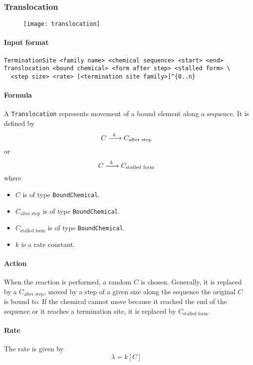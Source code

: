\subsubsection{Translocation}

\begin{figure}[!ht]
	\centering
	\texttt{[image: translocation]}
\end{figure}

\paragraph{Input format}
\begin{verbatim}
TerminationSite <family name> <chemical sequence> <start> <end>
Translocation <bound chemical> <form after step> <stalled form> \
  <step size> <rate> [<termination site family>]^{0..n}
\end{verbatim}

\paragraph{Formula} A \texttt{Translocation} represents movement of a bound element along a sequence. It is defined by
\[
	\reactionIrr{C}{C_\text{after step}}{k}{}
\]
or
\[
	\reactionIrr{C}{C_\text{stalled form}}{k}{}
\]
where
\begin{itemize}
	\item $C$ is of type \texttt{BoundChemical}.
	\item $C_\text{after step}$ is of type \texttt{BoundChemical}.
	\item $C_\text{stalled form}$ is of type \texttt{BoundChemical}.
	\item $k$ is a rate constant.
\end{itemize}

\paragraph{Action} When the reaction is performed, a random $C$ is chosen. Generally, it is replaced by a $C_\text{after step}$, moved by a step of a given size along the sequence the original $C$ is bound to. If the chemical cannot move because it reached the end of the sequence or it reaches a termination site, it is replaced by $C_\text{stalled form}$.

\paragraph{Rate} The rate is given by
\[
	\lambda = k [C]
\]

